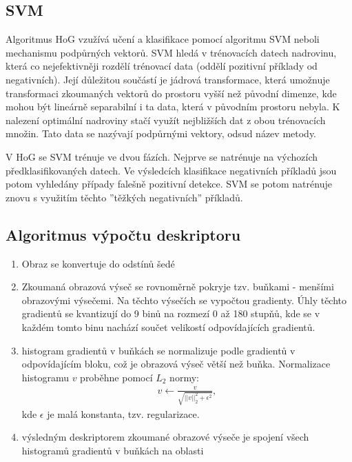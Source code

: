 	\subsection{SVM}
	
	Algoritmus HoG vzužívá učení a klasifikace pomocí algoritmu SVM neboli mechanismu podpůrných vektorů. SVM hledá v trénovacích datech nadrovinu, která co nejefektivněji rozdělí trénovací data (oddělí pozitivní příklady od negativních). Její důležitou součástí je jádrová transformace, která umožnuje transformaci zkoumaných vektorů do prostoru vyšší než původní dimenze, kde mohou být lineárně separabilní i ta data, která v původním prostoru nebyla. K nalezení optimální nadroviny stačí využít nejbližších dat z obou trénovacích množin. Tato data se nazývají podpůrnými vektory, odsud název metody.
	
	V HoG se SVM trénuje ve dvou fázích. Nejprve se natrénuje na výchozích předklasifikovaných datech. Ve výsledcích klasifikace negativních příkladů jsou potom vyhledány případy falešně pozitivní detekce. SVM se potom natrénuje znovu s využitím těchto ''těžkých negativních'' příkladů.
	
	\subsection{Algoritmus výpočtu deskriptoru}
	
	\begin{enumerate}
		\item Obraz se konvertuje do odstínů šedé
		\item Zkoumaná obrazová výseč se rovnoměrně pokryje tzv. buňkami - menšími obrazovými výsečemi. Na těchto výsečích se vypočtou gradienty. Úhly těchto gradientů se kvantizují do 9 binů na rozmezí 0 až 180 stupňů, kde se v každém tomto binu nachází součet velikostí odpovídajících gradientů.
		\item histogram gradientů v buňkách se normalizuje podle gradientů v odpovídajícím bloku, což je obrazová výseč větší než buňka. Normalizace histogramu $v$ proběhne pomocí $L_2$ normy:
		\begin{align}
		v \leftarrow \frac{v}{\sqrt{||v||_2^2 + \epsilon^2}},
		\end{align}
		kde $\epsilon$ je malá konstanta, tzv. regularizace.
		\item výsledným deskriptorem zkoumané obrazové výseče je spojení všech histogramů gradientů v buňkách na oblasti
	\end{enumerate}


